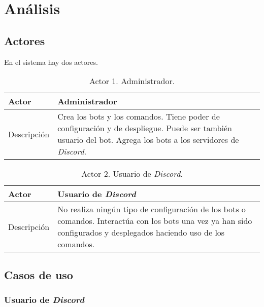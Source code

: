 \chapter{Análisis}

\section{Actores}

En el sistema hay dos actores.

\begin{table}[H]
    \centering
    \def\arraystretch{1.25}
    \begin{adjustbox}{max width=\textwidth}
    \begin{tabularx}{\textwidth}{l|L}
    \hline
        \textbf{Actor} & \textbf{Administrador} \\ \hline
    \hline
        Descripción & Crea los bots y los comandos. Tiene poder de configuración y de despliegue. Puede ser también usuario del bot. Agrega los bots a los servidores de \textit{Discord}. \\ \hline
    \end{tabularx}
    \end{adjustbox}
    \caption{Actor 1. Administrador.}
\end{table}

\begin{table}[H]
    \centering
    \def\arraystretch{1.25}
    \begin{adjustbox}{max width=\textwidth}
    \begin{tabularx}{\textwidth}{l|L}
    \hline
        \textbf{Actor} & \textbf{Usuario de \textit{Discord}} \\ \hline
    \hline
        Descripción & No realiza ningún tipo de configuración de los bots o comandos. Interactúa con los bots una vez ya han sido configurados y desplegados haciendo uso de los comandos. \\ \hline
    \end{tabularx}
    \end{adjustbox}
    \caption{Actor 2. Usuario de \textit{Discord}.}
\end{table}


\section{Casos de uso}

\subsection{Usuario de \textit{Discord}}

